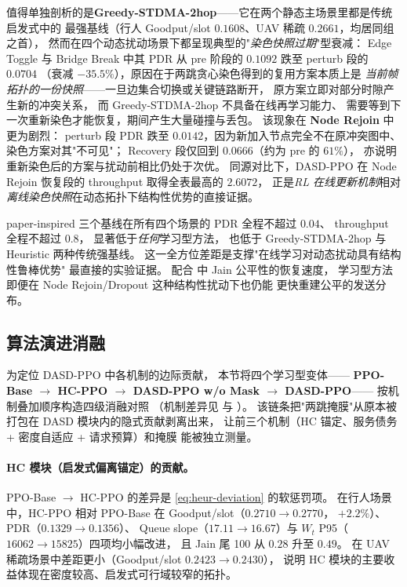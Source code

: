 值得单独剖析的是\textbf{Greedy-STDMA-2hop}——它在两个静态主场景里都是传统启发式中的
最强基线（行人 Goodput/slot \(0.1608\)、UAV 稀疏 \(0.2661\)，均居同组之首），
然而在四个动态扰动场景下都呈现典型的"\emph{染色快照过期}"型衰减：
Edge Toggle 与 Bridge Break 中其 PDR 从 pre 阶段的 \(0.1092\) 跌至 perturb 段的 \(0.0704\)
（衰减 \(-35.5\%\)），原因在于两跳贪心染色得到的复用方案本质上是
\emph{当前帧拓扑的一份快照}——一旦边集合切换或关键链路断开，
原方案立即对部分时隙产生新的冲突关系，
而 Greedy-STDMA-2hop 不具备在线再学习能力、
需要等到下一次重新染色才能恢复，期间产生大量碰撞与丢包。
该现象在 \textbf{Node Rejoin} 中更为剧烈：
perturb 段 PDR 跌至 \(0.0142\)，因为新加入节点完全不在原冲突图中、
染色方案对其"不可见"；
Recovery 段仅回到 \(0.0666\)（约为 pre 的 \(61\%\)），
亦说明重新染色后的方案与扰动前相比仍处于次优。
同源对比下，DASD-PPO 在 Node Rejoin 恢复段的 throughput 取得全表最高的 \(2.6072\)，
正是\emph{RL 在线更新机制}相对\emph{离线染色快照}在动态拓扑下结构性优势的直接证据。

paper-inspired 三个基线在所有四个场景的 PDR 全程不超过 \(0.04\)、
throughput 全程不超过 \(0.8\)，
显著低于\emph{任何}学习型方法，
也低于 Greedy-STDMA-2hop 与 Heuristic 两种传统强基线。
这一全方位差距是支撑"在线学习对动态扰动具有结构性鲁棒优势"
最直接的实验证据。
配合  中 Jain 公平性的恢复速度，
学习型方法即便在 Node Rejoin/Dropout 这种结构性扰动下也仍能
更快重建公平的发送分布。

\subsection{算法演进消融}
\label{subsec:ablation}

为定位 DASD-PPO 中各机制的边际贡献，
本节将四个学习型变体——
\textbf{PPO-Base \(\rightarrow\) HC-PPO \(\rightarrow\) DASD-PPO w/o Mask \(\rightarrow\) DASD-PPO}——
按机制叠加顺序构造四级消融对照
（机制差异见  与 ）。
该链条把"两跳掩膜"从原本被打包在 DASD 模块内的隐式贡献剥离出来，
让前三个机制（HC 锚定、服务债务 + 密度自适应 + 请求预算）和掩膜
能被独立测量。

\paragraph{HC 模块（启发式偏离锚定）的贡献。}
PPO-Base \(\rightarrow\) HC-PPO 的差异是 \eqref{eq:heur-deviation} 的软惩罚项。
在行人场景中，HC-PPO 相对 PPO-Base 在 Goodput/slot（\(0.2710\rightarrow 0.2770\)，
\(+2.2\%\)）、PDR（\(0.1329\rightarrow 0.1356\)）、
Queue slope（\(17.11\rightarrow 16.67\)）与 \(W_t\) P95（\(16062\rightarrow 15825\)）四项均小幅改进，
且 Jain 尾 100 从 \(0.28\) 升至 \(0.49\)。
在 UAV 稀疏场景中差距更小（Goodput/slot \(0.2423 \rightarrow 0.2430\)），
说明 HC 模块的主要收益体现在密度较高、启发式可行域较窄的拓扑。

